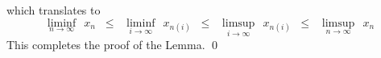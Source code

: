 which translates to
\begin{equation*}
\underset{n\rightarrow\infty}{\liminf}\;\, x_{n}
\;\; \leq \;\;
	\underset{i\rightarrow\infty}{\liminf}\;\, x_{n(i)}
\;\;\leq\;\;
	\underset{i\rightarrow\infty}{\limsup}\;\, x_{n(i)}
\;\; \leq \;\;
	\underset{n\rightarrow\infty}{\limsup}\;\, x_{n}
\end{equation*}
This completes the proof of the Lemma.
\qed


\renewcommand{\theenumi}{\roman{enumi}}
\renewcommand{\labelenumi}{\textnormal{(\theenumi)}$\;\;$}


